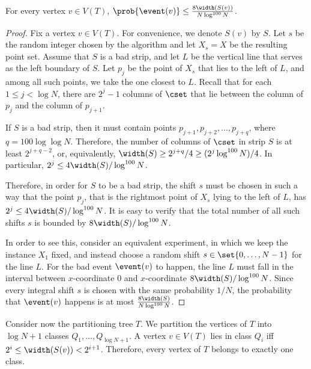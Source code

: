 %
	
%
%

\begin{claim}\label{claim: prob bad strip}
For every vertex $v\in V(T)$, $\prob{\event(v)}\leq \frac{8\width(S(v))}{N\log^{100} N}$.
\end{claim}

\begin{proof}
	Fix a vertex $v\in V(T)$.
	For convenience, we denote $S(v)$ by $S$. Let $s$ be the random integer chosen by the algorithm and let $X_s=X$ be the resulting point set.
	Assume that $S$ is a bad strip, and let $L$ be the vertical line that serves as the left boundary of $S$. Let $p_j$ be the point of $X_s$ that lies to the left of $L$, and among all such points, we take the one closest to $L$. Recall that for each $1\leq j< \log N$, there are $2^j-1$ columns of $\cset$ that lie between the column of $p_j$ and the column of $p_{j+1}$. %
	
	If $S$ is a bad strip, then it must contain points $p_{j+1},p_{j+2},\ldots,p_{j+q}$, where $q= 100\log\log N$. Therefore, the number of columns of $\cset$ in strip $S$ is at least $2^{j+q-2}$, or, equivalently, $\width(S)\geq 2^{j+q}/4\geq (2^j\log^{100}N)/4$. In particular, $2^j\leq 4\width(S)/\log^{100}N$. 
	
	Therefore, in order for $S$ to be a bad strip, the shift $s$ must be chosen in such a way that the point $p_j$, that is the rightmost point of $X_s$ lying to the left of $L$, has $2^j\leq 4\width(S)/\log^{100}N$. It is easy to verify that the total number of all such shifts $s$ is bounded by $8\width(S)/\log^{100}N$.
	
	In order to see this, consider an equivalent experiment, in which we keep the instance $X_1$ fixed, and instead choose a random shift $s\in \set{0,\ldots,N-1}$ for the line $L$. For the bad event $\event(v)$ to happen, the line $L$ must fall in the interval between $x$-coordinate $0$ and $x$-coordinate $8\width(S)/\log^{100}N$. Since every integral shift $s$ is chosen with the same probability $1/N$, the probability that $\event(v)$ happens is at most $\frac{8\width(S)}{N\log^{100} N}$.
\end{proof}


Consider now the partitioning tree $T$. We partition the vertices of $T$ into $\log N+1$ classes $Q_1,\ldots,Q_{\log N+1}$. A vertex $v\in V(T)$ lies in class $Q_i$ iff $2^i\leq \width(S(v))< 2^{i+1}$. Therefore, every vertex of $T$ belongs to exactly one class.


